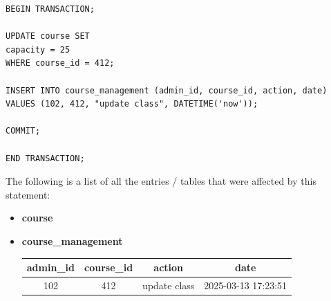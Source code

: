 \documentclass{report}
\makeatletter
\newenvironment{fullcenter}%
    {\@parboxrestore%
    \begin{adjustwidth}{}{\leftmargin}%
    \begin{center}%
    }{\end{center}%
    \end{adjustwidth}%
    }
\makeatother
\begin{document}
\begin{lstlisting}
BEGIN TRANSACTION;

UPDATE course SET
capacity = 25
WHERE course_id = 412;

INSERT INTO course_management (admin_id, course_id, action, date)
VALUES (102, 412, "update class", DATETIME('now'));

COMMIT;

END TRANSACTION;
\end{lstlisting}

The following is a list of all the entries / tables that were affected by this statement:

\begin{itemize}

    \item \textbf{course}
    \bigskip
    \begin{fullcenter}
    \end{fullcenter}

    \item \textbf{course\_management}
    \bigskip
    \begin{fullcenter}
        \begin{tabular}{| c | c | c | c |}
            \hline
            \textbf{admin\_id} & \textbf{course\_id} & \textbf{action} & \textbf{date} \\
            \hline
            102 & 412 & update class & 2025-03-13 17:23:51 \\
            \hline
        \end{tabular}
    \end{fullcenter}
    
\end{itemize}
\end{document}
